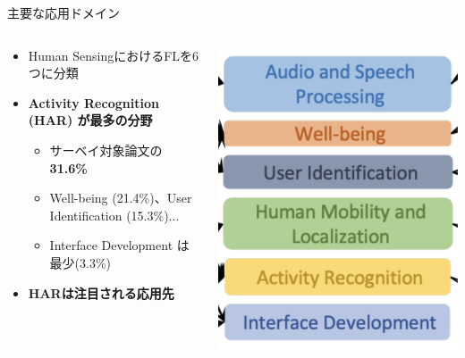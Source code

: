 \documentclass[unicode,12pt,aspectratio=169,dvipdfmx]{beamer}
\begin{document}
\begin{frame}{主要な応用ドメイン}
    \begin{columns}
        \begin{column}[T]{.6\linewidth}
            \begin{itemize}
                \item Human SensingにおけるFLを6つに分類
                \item \textbf{Activity Recognition (HAR) が最多の分野}
                \begin{itemize}
                    \item サーベイ対象論文の\textbf{31.6\%}
                    \item Well-being (21.4\%)、User Identification (15.3\%)...
                    \item Interface Development は最少(3.3\%)
                \end{itemize}
                \item \textbf{HARは注目される応用先}
            \end{itemize}
        \end{column}
        \begin{column}[T]{.4\linewidth}
            \includegraphics[scale=0.6]{figures/対象の分野.png}                    
        \end{column}
    \end{columns}
    \end{frame}
\end{document}
